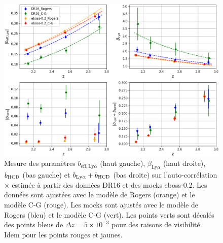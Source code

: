 

\begin{figure}
  \centering
  \includegraphics[scale=0.44]{bias_CG_mask}
  \caption{Mesure des paramètres $b_{\mathrm{eff},\mathrm{Ly}\alpha}$ (haut gauche), $\beta_{\mathrm{Ly}\alpha}$ (haut droite), $b_{\textsc{HCD}}$ (bas gauche) et $b_{\mathrm{Ly}\alpha} + b_{\textsc{HCD}}$ (bas droite) sur l'auto-corrélation \lya$\times$\lya{} estimée à partir des données DR16 et des mocks eboss-0.2. Les données sont ajustées avec le modèle de Rogers (orange) et le modèle C-G (rouge). Les mocks sont ajustés avec le modèle de Rogers (bleu) et le modèle C-G (vert). Les points verts sont décalés des points bleus de $\Delta z = 5\times10^{-3}$ pour des raisons de visibilité. Idem pour les points rouges et jaunes.}
  \label{fig:bias_CG_mask}
\end{figure}


